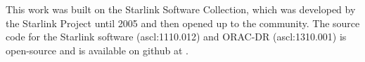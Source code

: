 \documentclass[final,authoryear,5p,times,twocolumn]{elsarticle}
\begin{document}
This work was built on the Starlink Software Collection, which was
developed by the Starlink Project until 2005
\citep{1982QJRAS..23..485D,2005ASPC..347...22D,2008ASPC..394..650C}
and then opened up to the community. The source code for the Starlink
software (ascl:1110.012) and ORAC-DR (ascl:1310.001) is open-source and is
available on github at
.



\end{document}
